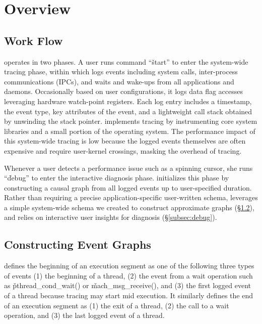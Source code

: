 \section{Overview}
\label{sec:overview}

\subsection{\xxx Work Flow}

\xxx operates in two phases.  A user runs command ``\v{\xxx start}'' to
enter the system-wide tracing phase, within which \xxx logs events
including system calls, inter-process communications (IPCs), and waits and
wake-ups from all applications and daemons.  Occasionally based on user
configurations, it logs data flag accesses leveraging hardware
watch-point registers.  Each log entry includes a timestamp, the event
type, key attributes of the event, and a lightweight call stack obtained
by unwinding the stack pointer.  \xxx implements tracing by instrumenting
core system libraries and a small portion of the operating system.  The
performance impact of this system-wide tracing is low because the logged
events themselves are often expensive and require user-kernel crossings,
masking the overhead of tracing.

Whenever a user detects a performance issue such as a spinning cursor, she
runs ``\v{\xxx debug}'' to enter the interactive diagnosis phase.  \xxx
initializes this phase by constructing a causal graph from all logged
events up to user-specified duration.  Rather than requiring a precise
application-specific user-written schema, \xxx leverages a simple
system-wide schema we created to construct approximate graphs
(\S\ref{subsec:graph}), and relies on interactive user insights for
diagnosis (\S\ref{subsec:debug}).

\subsection{Constructing Event Graphs} \label{subsec:graph}

\xxx defines the beginning of an execution segment as one of the following
three types of events (1) the beginning of a thread, (2) the event from a
wait operation such as \v{pthread\_cond\_wait()} or
\v{mach\_msg\_receive()}, and (3) the first logged event of a thread
because tracing may start mid execution.  It similarly defines the end of
an execution segment as (1) the exit of a thread, (2) the call to a wait
operation, and (3) the last logged event of a thread.

